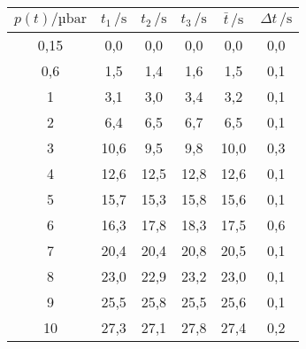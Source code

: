 \begin{table}[htp]
	\begin{center}
		\begin{tabular}{c|ccc|cc}
			\toprule
			{$p(t) /\mathrm{µbar}$} & {$t_1\, /\mathrm{s}$} & {$t_2\, /\mathrm{s}$} & {$t_3\, /\mathrm{s}$} & {$\bar{t}\, /\mathrm{s}$} & {$\Delta t\, /\mathrm{s}$} \\ \midrule
			         0,15           &          0,0          &          0,0          &          0,0          &            0,0            &            0,0             \\
			          0,6           &          1,5          &          1,4          &          1,6          &            1,5            &            0,1             \\
			           1            &          3,1          &          3,0          &          3,4          &            3,2            &            0,1             \\
			           2            &          6,4          &          6,5          &          6,7          &            6,5            &            0,1             \\
			           3            &         10,6          &          9,5          &          9,8          &           10,0            &            0,3             \\
			           4            &         12,6          &         12,5          &         12,8          &           12,6            &            0,1             \\
			           5            &         15,7          &         15,3          &         15,8          &           15,6            &            0,1             \\
			           6            &         16,3          &         17,8          &         18,3          &           17,5            &            0,6             \\
			           7            &         20,4          &         20,4          &         20,8          &           20,5            &            0,1             \\
			           8            &         23,0          &         22,9          &         23,2          &           23,0            &            0,1             \\
			           9            &         25,5          &         25,8          &         25,5          &           25,6            &            0,1             \\
			          10            &         27,3          &         27,1          &         27,8          &           27,4            &            0,2             \\ \hline

\end{tabular}
\end{center}
\end{table}
